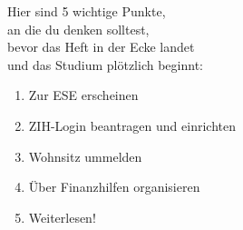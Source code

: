 
\hspace*{4em}Hier sind 5 wichtige Punkte,\\
\hspace*{8em}an die du denken solltest,\\
\hspace*{12em}bevor das Heft in der Ecke landet\\
\hspace*{16em}und das Studium plötzlich beginnt:\\[2em]

{%
\LARGE
\hspace*{2cm}
\begin{enumerate}[label={\raisebox{.1cm}{\colorbox{gray!60}{\normalsize\textcolor{white}{\arabic*}}}}, itemsep=1cm, labelsep=.75cm, labelindent=.75cm, leftmargin=*]
  \item Zur ESE erscheinen
  \item ZIH-Login beantragen und einrichten
  \item Wohnsitz ummelden
  \item Über Finanzhilfen organisieren
  \item Weiterlesen!
\end{enumerate}
}
